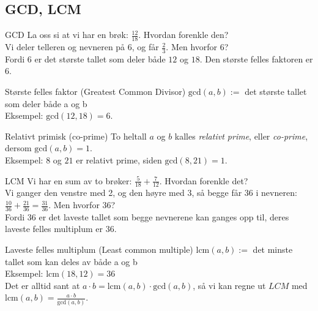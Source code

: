 \subsection{GCD, LCM}

\begin{frame}{GCD}
    La oss si at vi har en brøk: $\frac{12}{18}$. Hvordan forenkle den?\\
    \pause
    Vi deler telleren og nevneren på 6, og får $\frac{2}{3}$. Men hvorfor 6?\\
    \pause
    Fordi 6 er det største tallet som deler både $12$ og $18$. Den største felles faktoren er 6.

    \begin{block}{Største felles faktor (Greatest Common Divisor)}
        $\text{gcd}(a,b) := $ det største tallet som deler både a og b\\
        Eksempel: $\text{gcd}(12, 18) = 6$.
    \end{block}

    \pause
    \begin{block}{Relativt primisk (co-prime)}
        To heltall $a$ og $b$ kalles \emph{relativt prime}, eller \emph{co-prime}, dersom $\text{gcd}(a,b)=1$.\\
        Eksempel: $8$ og $21$ er relativt prime, siden $\text{gcd}(8,21) = 1$.
    \end{block}
\end{frame}

\begin{frame}{LCM}
    Vi har en sum av to brøker: $\frac{5}{18} + \frac{7}{12}$. Hvordan forenkle det?\\
    \pause
    Vi ganger den venstre med 2, og den høyre med 3, så begge får 36 i nevneren:\\
     $\frac{10}{36} + \frac{21}{36} = \frac{31}{36}$. Men hvorfor 36?\\
    \pause
    Fordi 36 er det laveste tallet som begge nevnerene kan ganges opp til, deres laveste felles multiplum er 36.
    \begin{block}{Laveste felles multiplum (Least common multiple)}
        $\text{lcm}(a,b) :=$ det minste tallet som kan deles av både a og b\\
        Eksempel: $\text{lcm}(18,12)=36$\\
        Det er alltid sant at $a \cdot b = \text{lcm}(a,b) \cdot \text{gcd}(a,b)$, så vi kan regne ut $LCM$ med $\text{lcm}(a,b) = \frac{a \cdot b}{\text{gcd}(a,b)}$.
    \end{block}
\end{frame}

